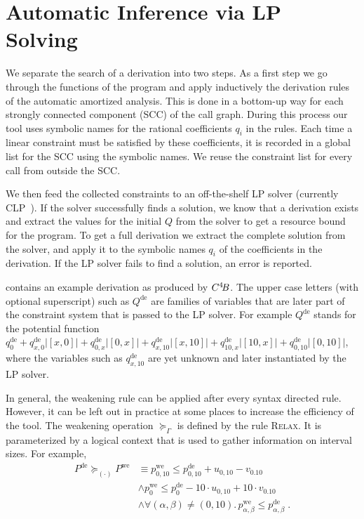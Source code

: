 \documentclass[nocopyrightspace,preprint,pldi]{sigplanconf-pldi15}
\newcommand{\ifshort}[2]{\ifx\fullversion\undefined{#1}\else{#2}\fi}
\newcommand{\sectskip}[0]{\ifshort{\vspace{-3pt}}{}}
\newcommand{\aftersectskip}[0]{\ifshort{\vspace{-1pt}}{}}
\newcommand{\pref}[1]{\prettyref{#1}}
\begin{document}
\sectskip
\section{Automatic Inference via LP Solving}
\label{sec:lp}
\aftersectskip

We separate the search of a derivation into two steps.  As a first
step we go through the functions of the program and apply inductively
the derivation rules of the automatic amortized analysis.  This is
done in a bottom-up way for each strongly connected component (SCC) of the
call graph.  During this
process our tool uses symbolic names for the rational coefficients
$q_i$ in the rules.  Each time a linear constraint must be
satisfied by these coefficients, it is recorded in a global list for the SCC using
the symbolic names.  We reuse the constraint list for
every call from outside the SCC.


We then feed the collected constraints to an
off-the-shelf LP solver (currently CLP~\cite{clp}).
If the solver successfully finds a solution, we know that a derivation
exists and extract the values for the initial
$Q$ from the solver to get a resource bound for the program.  To get
a full derivation we extract the complete solution from the
solver, and apply it to the symbolic names $q_i$ of the coefficients
in the derivation.  If the LP solver fails to find a solution, an
error is reported.

\pref{fig:derivation} contains an example derivation as produced
by $C^4\!B$.  The upper case letters (with optional
superscript) such as $Q^\text{de}$ are families of
variables that are later part of the constraint system that is passed
to the LP solver.  For example $Q^\text{de}$ stands for the potential
function $q^\text{de}_0 + q^\text{de}_{x,0} |[x,0]| +
q^\text{de}_{0,x} |[0,x]| + q^\text{de}_{x,10} |[x,10]| +
q^\text{de}_{10,x} |[10,x]| + q^\text{de}_{0,10} |[0,10]|$, where the
variables such as $q^\text{de}_{x,10}$ are yet unknown and later
instantiated by the LP solver.

In general, the weakening rule can be applied after every syntax directed
rule.  However, it can be left out in practice at some places to
increase the efficiency of the tool.
The weakening operation $\succeq_{\Gamma}$ is defined by the rule
\textsc{Relax}. It is parameterized by a logical context that is
used to gather information on interval sizes.  For example,
{%
  \begin{align*}
  P^\text{de} \succeq_{(\cdot)} P^\text{we} &\equiv
 p^\text{we}_{0,10} \leq p^\text{de}_{0,10} + u_{0,10} - v_{0.10} \\
&\land  p^\text{we}_{0} \leq p^\text{de}_{0} - 10 {\cdot} u_{0,10} + 10 {\cdot} v_{0.10} \\
&\land  \forall (\alpha, \beta) \neq (0,10)  . \, p^\text{we}_{\alpha,\beta} \leq p^\text{de}_{\alpha,\beta} \;.
  \end{align*}
}
\end{document}
